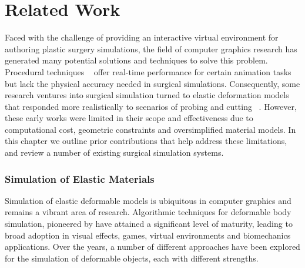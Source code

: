 


\chapter{Related Work}
\label{chp:relatedwork}

Faced with the challenge of providing an interactive virtual
environment for authoring plastic surgery simulations, the field of
computer graphics research has generated many potential solutions and
techniques to solve this problem. Procedural techniques
~\citep{JoshiMDGS:2007,WangP:2002,KavanCZO:2008,VaillBGCRWGP:2013} offer real-time
performance for certain animation tasks but lack the physical accuracy
needed in surgical simulations. Consequently, some research ventures
into surgical simulation turned to elastic deformation models
~\citep{TerzoPBF:1987} that responded more realistically to scenarios of
probing and cutting ~\citep{BroC:1996,MendoL:2003,NienhS:2001}. However,
these early works were limited in their scope and effectiveness due to
computational cost, geometric constraints and oversimplified material
models. In this chapter we outline prior contributions that help
address these limitations, and review a number of existing surgical
simulation systems.

\subsection{Simulation of Elastic Materials}

Simulation of elastic deformable models is ubiquitous in computer
graphics and remains a vibrant area of research. Algorithmic
techniques for deformable body simulation, pioneered by \citet{TerzoPBF:1987} have attained a significant level of
maturity, leading to broad adoption in visual effects, games, virtual
environments and biomechanics applications. Over the years, a number
of different approaches have been explored for the simulation of
deformable objects, each with different strengths. 

